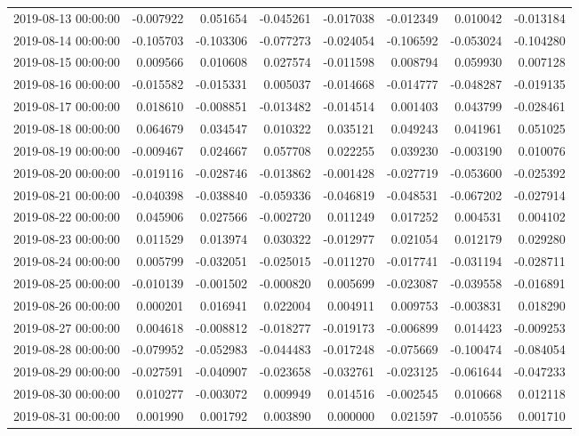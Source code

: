 \begin{tabular}{lrrrrrrr}
2019-08-13 00:00:00 & -0.007922 & 0.051654 & -0.045261 & -0.017038 & -0.012349 & 0.010042 & -0.013184 \\
2019-08-14 00:00:00 & -0.105703 & -0.103306 & -0.077273 & -0.024054 & -0.106592 & -0.053024 & -0.104280 \\
2019-08-15 00:00:00 & 0.009566 & 0.010608 & 0.027574 & -0.011598 & 0.008794 & 0.059930 & 0.007128 \\
2019-08-16 00:00:00 & -0.015582 & -0.015331 & 0.005037 & -0.014668 & -0.014777 & -0.048287 & -0.019135 \\
2019-08-17 00:00:00 & 0.018610 & -0.008851 & -0.013482 & -0.014514 & 0.001403 & 0.043799 & -0.028461 \\
2019-08-18 00:00:00 & 0.064679 & 0.034547 & 0.010322 & 0.035121 & 0.049243 & 0.041961 & 0.051025 \\
2019-08-19 00:00:00 & -0.009467 & 0.024667 & 0.057708 & 0.022255 & 0.039230 & -0.003190 & 0.010076 \\
2019-08-20 00:00:00 & -0.019116 & -0.028746 & -0.013862 & -0.001428 & -0.027719 & -0.053600 & -0.025392 \\
2019-08-21 00:00:00 & -0.040398 & -0.038840 & -0.059336 & -0.046819 & -0.048531 & -0.067202 & -0.027914 \\
2019-08-22 00:00:00 & 0.045906 & 0.027566 & -0.002720 & 0.011249 & 0.017252 & 0.004531 & 0.004102 \\
2019-08-23 00:00:00 & 0.011529 & 0.013974 & 0.030322 & -0.012977 & 0.021054 & 0.012179 & 0.029280 \\
2019-08-24 00:00:00 & 0.005799 & -0.032051 & -0.025015 & -0.011270 & -0.017741 & -0.031194 & -0.028711 \\
2019-08-25 00:00:00 & -0.010139 & -0.001502 & -0.000820 & 0.005699 & -0.023087 & -0.039558 & -0.016891 \\
2019-08-26 00:00:00 & 0.000201 & 0.016941 & 0.022004 & 0.004911 & 0.009753 & -0.003831 & 0.018290 \\
2019-08-27 00:00:00 & 0.004618 & -0.008812 & -0.018277 & -0.019173 & -0.006899 & 0.014423 & -0.009253 \\
2019-08-28 00:00:00 & -0.079952 & -0.052983 & -0.044483 & -0.017248 & -0.075669 & -0.100474 & -0.084054 \\
2019-08-29 00:00:00 & -0.027591 & -0.040907 & -0.023658 & -0.032761 & -0.023125 & -0.061644 & -0.047233 \\
2019-08-30 00:00:00 & 0.010277 & -0.003072 & 0.009949 & 0.014516 & -0.002545 & 0.010668 & 0.012118 \\
2019-08-31 00:00:00 & 0.001990 & 0.001792 & 0.003890 & 0.000000 & 0.021597 & -0.010556 & 0.001710 \\

\end{tabular}
